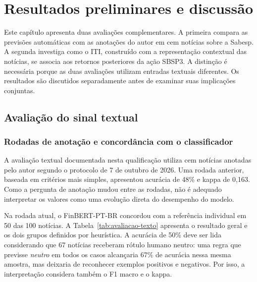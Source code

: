 \chapter{Resultados preliminares e discussão}
\label{cap:resultados}

Este capítulo apresenta duas avaliações complementares. A primeira compara as previsões automáticas com as anotações do autor em cem notícias sobre a Sabesp. A segunda investiga como o ITI, construído com a representação contextual das notícias, se associa aos retornos posteriores da ação SBSP3. A distinção é necessária porque as duas avaliações utilizam entradas textuais diferentes. Os resultados são discutidos separadamente antes de examinar suas implicações conjuntas.

\section{Avaliação do sinal textual}

\subsection{Rodadas de anotação e concordância com o classificador}

A avaliação textual documentada nesta qualificação utiliza cem notícias anotadas pelo autor segundo o protocolo de 7 de outubro de 2026. Uma rodada anterior, baseada em critérios mais simples, apresentou acurácia de 48\% e kappa de 0,163. Como a pergunta de anotação mudou entre as rodadas, não é adequado interpretar os valores como uma evolução direta do desempenho do modelo.

Na rodada atual, o FinBERT-PT-BR concordou com a referência individual em 50 das 100 notícias. A Tabela~\ref{tab:avaliacao-texto} apresenta o resultado geral e os dois grupos definidos por heurística. A acurácia de 50\% deve ser lida considerando que 67 notícias receberam rótulo humano neutro: uma regra que previsse \emph{neutro} em todos os casos alcançaria 67\% de acurácia nessa mesma amostra, mas deixaria de reconhecer exemplos positivos e negativos. Por isso, a interpretação considera também o F1 macro e o kappa.

